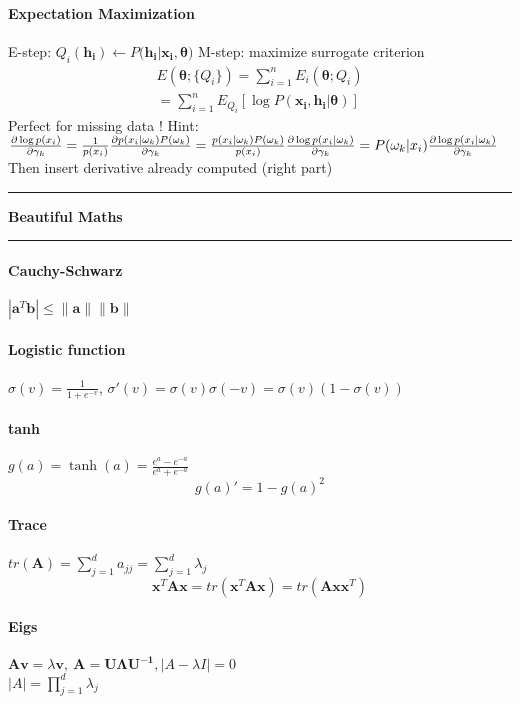 \documentclass[7pt]{scrartcl}
\newlength{\secskip}
\renewcommand{\section}[1]{
  \hrule\vspace{.1em}
  \textbf{#1}
  \hrule
}
\renewcommand{\vec}{\mathbf}
\begin{document}
\begin{multicols}{4}
\paragraph{Expectation Maximization}
E-step: $Q_i(\vec{h_i}) \leftarrow P(\vec{h_i}|\vec{x_i},\vec{\theta)}$
M-step: maximize surrogate criterion
\begin{align*}
E(\vec{\theta};\{Q_i\}) = \sum_{i=1}^n E_i(\vec{\theta};Q_i) \\=
\sum_{i=1}^n E_{Q_i} [\log P(\vec{x_i},\vec{h_i}|\vec{\theta})]
\end{align*}
Perfect for missing data !
Hint:
$
\frac{\partial \log p(x_i)}{\partial \gamma_k} = \frac{1}{p(x_i)}\frac{\partial p(x_i|\omega_k)P(\omega_k)}{\partial \gamma_k} \\
= \frac{p(x_i|\omega_k)P(\omega_k)}{p(x_i)}\frac{\partial \log p(x_i|\omega_k)}{\partial \gamma_k} \\
= P(\omega_k|x_i) \frac{\partial \log p(x_i|\omega_k)}{\partial \gamma_k}
$ Then insert derivative already computed (right part)
\section{Beautiful Maths} 
\paragraph{Cauchy-Schwarz}
 $|\vec a ^T \vec b|\leq \| \vec a \| \| \vec b \|$
\paragraph{Logistic function}
$\sigma(v) = \frac{1}{1+e^{-v}}$,
$\sigma'(v) = \sigma(v)\sigma(-v) = \sigma(v)(1-\sigma(v))$
\paragraph{tanh}
$g(a)=\tanh(a)=\frac{e^a-e^{-a}}{e^a + e^{-a}}$
$$g(a)'=1 - g(a)^2$$
\paragraph{Trace}
$tr(\vec{A}) = \sum_{j=1}^{d}a_{jj} = \sum_{j=1}^d \lambda_j$
\[\vec{x}^T \vec{A} \vec{x} = tr(\vec{x}^T \vec{A} \vec{x}) = tr(\vec{A} \vec{xx}^T)\]
\paragraph{Eigs}
$\vec{Av} = \lambda \vec{v}, ~\vec{A} = \vec{U \Lambda U^{-1}}, |A-\lambda I|=0$\\
$|A| = \prod_{j=1}^d \lambda_j$

\end{multicols}
\end{document}
